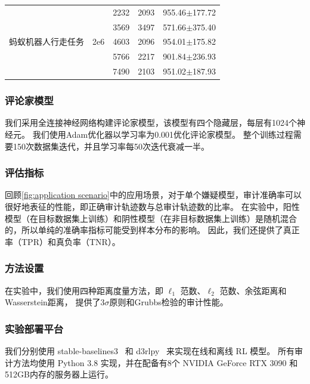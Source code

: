 \begin{table}[!ht]
\begin{tabular}{ccccc}
        \hline
        \multirow{5}{*}{蚂蚁机器人行走任务}            & \multirow{5}{*}{2e6}           & 2232                 & 2093                            & 955.46$\pm$177.72              \\
                                        &                                & 3569                 & 3497                            & 571.66$\pm$375.40              \\
                                        &                                & 4603                 & 2096                            & 954.01$\pm$175.82              \\
                                        &                                & 5766                 & 2217                            & 901.84$\pm$236.93              \\
                                        &                                & 7490                 & 2103                            & 951.02$\pm$187.93              \\
        \bottomrule
    \end{tabular}
\end{table}


\subsubsection{评论家模型}
我们采用全连接神经网络构建评论家模型，该模型有四个隐藏层，每层有1024个神经元。
我们使用Adam优化器以学习率为0.001优化评论家模型。
整个训练过程需要150次数据集迭代，并且学习率每50次迭代衰减一半。

\subsubsection{评估指标}
回顾\autoref{fig:application scenario}中\sysnameo 的应用场景，对于单个嫌疑模型，审计准确率可以很好地表征\sysnameo 的性能，即正确审计轨迹数与总审计轨迹数的比率。
在实验中，阳性模型（在目标数据集上训练）和阴性模型（在非目标数据集上训练）是随机混合的，所以单纯的准确率指标可能受到样本分布的影响。
因此，我们还提供了真正率（TPR）和真负率（TNR）。

\subsubsection{方法设置}
在实验中，我们使用四种距离度量方法，即 $\ell_1$ 范数、$\ell_2$ 范数、余弦距离和Wasserstein距离，
提供了3$\sigma$原则和Grubbs检验的审计性能。

\subsubsection{实验部署平台}
我们分别使用 stable-baselines3~\cite{stable-baselines3} 和 d3rlpy~\cite{d3rlpy} 来实现在线和离线 RL 模型。
所有审计方法均使用 Python 3.8 实现，并在配备有8个 NVIDIA GeForce RTX 3090 和512GB内存的服务器上运行。


